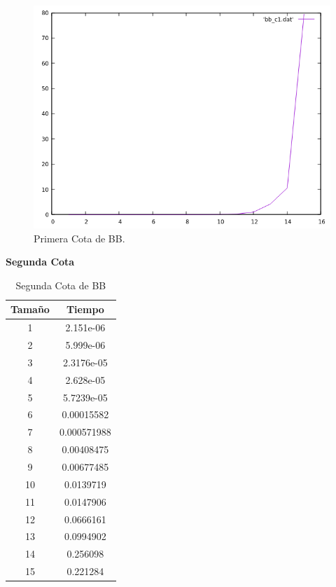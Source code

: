 \documentclass[a4paper,12pt,twoside]{article} %
\begin{document}
\begin{figure}[h]
  \begin{center}
  
  	\includegraphics[scale=0.7]{IMAGENES/bb_c1.png}
  	\caption{Primera Cota de BB.}
  	
  \end{center}
\end{figure}
\newpage

\textbf{Segunda Cota}

\begin{table}[h]
    \begin{center}
	\begin{tabular}{|c|c|}
		\hline
		Tamaño & Tiempo \\
		\hline
            1 & 2.151e-06 \\
            2 & 5.999e-06 \\
            3 & 2.3176e-05 \\
            4 & 2.628e-05 \\
            5 & 5.7239e-05 \\
            6 & 0.00015582 \\
            7 & 0.000571988 \\
            8 & 0.00408475 \\
            9 & 0.00677485 \\
            10 & 0.0139719 \\
            11 & 0.0147906 \\
            12 & 0.0666161 \\
            13 & 0.0994902 \\
            14 & 0.256098 \\
            15 & 0.221284 \\
		\hline
	\end{tabular}
    \end{center}
    \caption{Segunda Cota de BB}
\end{table}
\newpage
\end{document}
